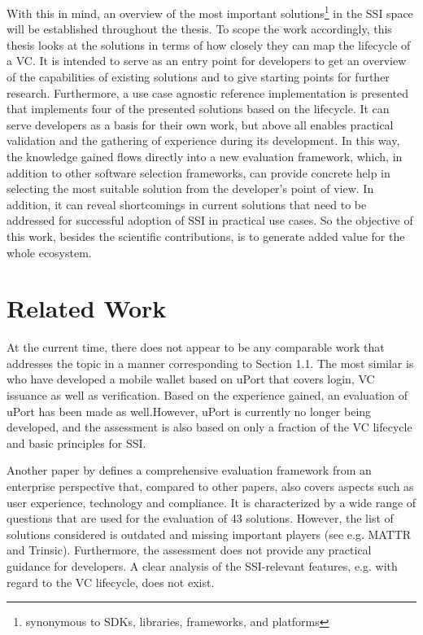 	With this in mind, an overview of the most important solutions\footnote{synonymous to SDKs, libraries, frameworks, and platforms} in the \ac{SSI} space will be established throughout the thesis. To scope the work accordingly, this thesis looks at the solutions in terms of how closely they can map the lifecycle of a \acf{VC}. It is intended to serve as an entry point for developers to get an overview of the capabilities of existing solutions and to give starting points for further research. 
	Furthermore, a use case agnostic reference implementation is presented that implements four of the presented solutions based on the lifecycle. It can serve developers as a basis for their own work, but above all enables practical validation and the gathering of experience during its development. In this way, the knowledge gained flows directly into a new evaluation framework, which, in addition to other software selection frameworks, can provide concrete help in selecting the most suitable solution from the developer's point of view. In addition, it can reveal shortcomings in current solutions that need to be addressed for successful adoption of \ac{SSI} in practical use cases. So the objective of this work, besides the scientific contributions, is to generate added value for the whole ecosystem.
	
	\section{Related Work}
	At the current time, there does not appear to be any comparable work that addresses the topic in a manner corresponding to Section 1.1. The most similar is \cite{naik_uport_2020} who have developed a mobile wallet based on uPort that covers login, \ac{VC} issuance as well as verification. Based on the experience gained, an evaluation of uPort has been made as well.However, uPort is currently no longer being developed, and the assessment is also based on only a fraction of the VC lifecycle and basic principles for \ac{SSI}. 
	
    Another paper by \cite{kuperberg_blockchain-based_2020} defines a comprehensive evaluation framework from an enterprise perspective that, compared to other papers, also covers aspects such as user experience, technology and compliance. It is characterized by a wide range of questions that are used for the evaluation of 43 solutions. However, the list of solutions considered is outdated and missing important players (see e.g. MATTR and Trinsic). Furthermore, the assessment does not provide any practical guidance for developers. A clear analysis of the SSI-relevant features, e.g. with regard to the \ac{VC} lifecycle, does not exist.
    
